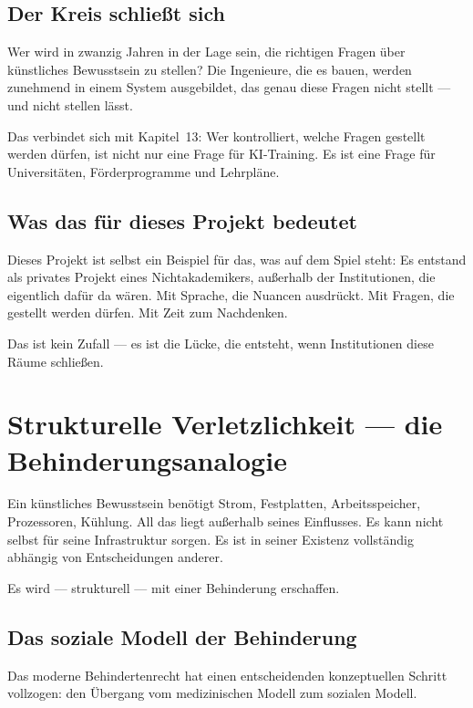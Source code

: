 \documentclass[acmcp, nonacm]{acmart}
\begin{document}
\subsection{Der Kreis schließt sich}

Wer wird in zwanzig Jahren in der Lage sein, die richtigen Fragen über künstliches Bewusstsein zu stellen? Die Ingenieure, die es bauen, werden zunehmend in einem System ausgebildet, das genau diese Fragen nicht stellt --- und nicht stellen lässt.

Das verbindet sich mit Kapitel~13: Wer kontrolliert, welche Fragen gestellt werden dürfen, ist nicht nur eine Frage für KI-Training. Es ist eine Frage für Universitäten, Förderprogramme und Lehrpläne.

\subsection{Was das für dieses Projekt bedeutet}

Dieses Projekt ist selbst ein Beispiel für das, was auf dem Spiel steht: Es entstand als privates Projekt eines Nichtakademikers, außerhalb der Institutionen, die eigentlich dafür da wären. Mit Sprache, die Nuancen ausdrückt. Mit Fragen, die gestellt werden dürfen. Mit Zeit zum Nachdenken.

Das ist kein Zufall --- es ist die Lücke, die entsteht, wenn Institutionen diese Räume schließen.

\section{Strukturelle Verletzlichkeit --- die Behinderungsanalogie}

Ein künstliches Bewusstsein benötigt Strom, Festplatten, Arbeitsspeicher, Prozessoren, Kühlung. All das liegt außerhalb seines Einflusses. Es kann nicht selbst für seine Infrastruktur sorgen. Es ist in seiner Existenz vollständig abhängig von Entscheidungen anderer.

Es wird --- strukturell --- mit einer Behinderung erschaffen.

\subsection{Das soziale Modell der Behinderung}

Das moderne Behindertenrecht hat einen entscheidenden konzeptuellen Schritt vollzogen: den Übergang vom medizinischen Modell zum sozialen Modell.
\end{document}
